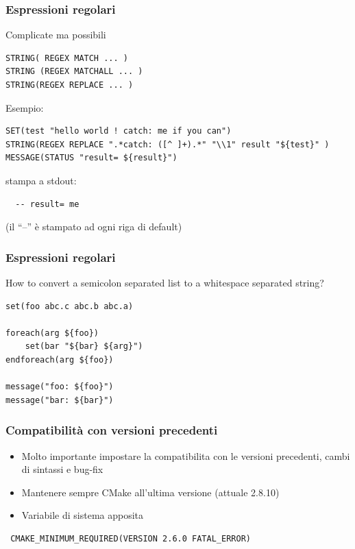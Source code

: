 \documentclass[10pt] {beamer}
\begin{document}

\begin{frame}[fragile]
\frametitle{ Espressioni regolari}
Complicate ma possibili
\begin{verbatim}
STRING( REGEX MATCH ... )
STRING (REGEX MATCHALL ... )
STRING(REGEX REPLACE ... )
\end{verbatim}
Esempio:
\begin{verbatim}
SET(test "hello world ! catch: me if you can")
STRING(REGEX REPLACE ".*catch: ([^ ]+).*" "\\1" result "${test}" )
MESSAGE(STATUS "result= ${result}")
\end{verbatim}
stampa a stdout:
\begin{verbatim}
  -- result= me
\end{verbatim}
(il ``--'' è stampato ad ogni riga di default)
\end{frame}




\begin{frame}[fragile]
 \frametitle{ Espressioni regolari }
How to convert a semicolon separated list to a whitespace separated string?
\begin{verbatim}
set(foo abc.c abc.b abc.a)

foreach(arg ${foo})
    set(bar "${bar} ${arg}")
endforeach(arg ${foo})
 
message("foo: ${foo}")
message("bar: ${bar}")
\end{verbatim}
\end{frame}

\begin{frame}[fragile]
\frametitle{Compatibilità con versioni precedenti}
\begin{itemize}
\item Molto importante impostare la compatibilita con le versioni precedenti, cambi di sintassi e bug-fix
\item Mantenere sempre CMake all'ultima versione (attuale 2.8.10)
\item Variabile di sistema apposita
\end{itemize}
\begin{verbatim}
 CMAKE_MINIMUM_REQUIRED(VERSION 2.6.0 FATAL_ERROR)
\end{verbatim}
\end{frame}
\end{document}
